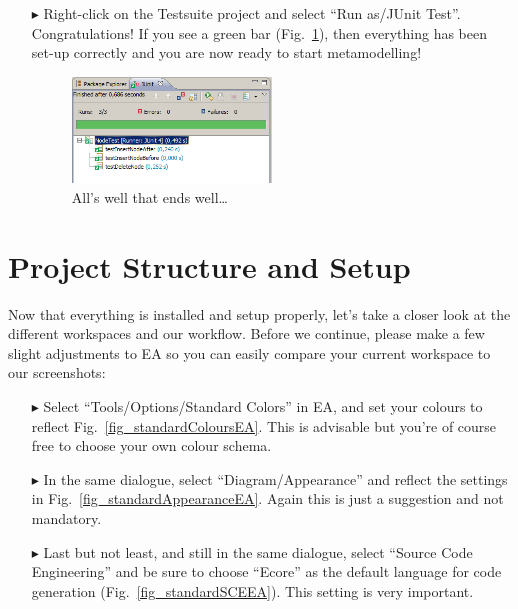\begin{enumerate}
\item[$\blacktriangleright$] Right-click on the Testsuite project and select
``Run as/JUnit Test''.
Congratulations!  If you see a green bar  (Fig.~\ref{fig_eclipsetestsuiterun}),
then everything has been set-up correctly and you are now ready to start
metamodelling!
\begin{figure}[htbp]
	\centering
  \includegraphics[width=0.5\textwidth]{pics/installationAndSetup/eclipse_testsuiterun.png}
	\caption{All's well that ends well\ldots}
	\label{fig_eclipsetestsuiterun}
\end{figure}
\end{enumerate}



\section{Project Structure and Setup}
Now that everything is installed and setup properly, let's take a closer look at
the different workspaces and our workflow.  Before we continue, please make
a few slight adjustments to EA so you can easily compare your current workspace 
to our screenshots:
\begin{itemize}
  \item[$\blacktriangleright$] Select ``Tools/Options/Standard Colors'' in EA,
  and set your colours to reflect Fig.~\ref{fig_standardColoursEA}.  This is
  advisable but you're of course free to choose your own colour schema.
  \item[$\blacktriangleright$] In the same dialogue, select
  ``Diagram/Appearance'' and reflect the settings in
  Fig.~\ref{fig_standardAppearanceEA}.  Again this is just a suggestion and not
  mandatory.
  \item[$\blacktriangleright$] Last but not least, and still in the same
  dialogue, select ``Source Code Engineering'' and be sure to choose ``Ecore''
  as the default language for code generation (Fig.~\ref{fig_standardSCEEA}). 
  This setting is very important.
\end{itemize}

